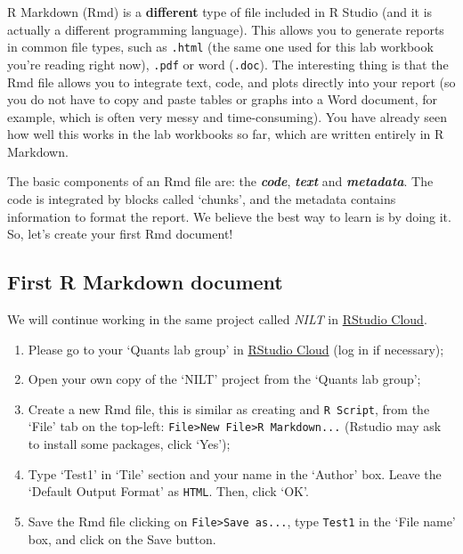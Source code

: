 \documentclass[
]{book}
\providecommand{\tightlist}{%
  \setlength{\itemsep}{0pt}\setlength{\parskip}{0pt}}
\begin{document}
R Markdown (Rmd) is a \textbf{different} type of file included in R Studio (and it is actually a different programming language). This allows you to generate reports in common file types, such as \texttt{.html} (the same one used for this lab workbook you're reading right now), \texttt{.pdf} or word (\texttt{.doc}). The interesting thing is that the Rmd file allows you to integrate text, code, and plots directly into your report (so you do not have to copy and paste tables or graphs into a Word document, for example, which is often very messy and time-consuming). You have already seen how well this works in the lab workbooks so far, which are written entirely in R Markdown.

The basic components of an Rmd file are: the \textbf{\emph{code}}, \textbf{\emph{text}} and \textbf{\emph{metadata}}. The code is integrated by blocks called `chunks', and the metadata contains information to format the report. We believe the best way to learn is by doing it. So, let's create your first Rmd document!

\hypertarget{first-r-markdown-document}{%
\subsection{First R Markdown document}\label{first-r-markdown-document}}

We will continue working in the same project called \emph{NILT} in \href{https://rstudio.cloud/}{RStudio Cloud}.

\begin{enumerate}
\def\labelenumi{\arabic{enumi}.}
\tightlist
\item
  Please go to your `Quants lab group' in \href{https://rstudio.cloud/}{RStudio Cloud} (log in if necessary);
\item
  Open your own copy of the `NILT' project from the `Quants lab group';
\item
  Create a new Rmd file, this is similar as creating and \texttt{R\ Script}, from the `File' tab on the top-left: \texttt{File\textgreater{}New\ File\textgreater{}R\ Markdown...} (Rstudio may ask to install some packages, click `Yes');
\item
  Type `Test1' in `Tile' section and your name in the `Author' box. Leave the `Default Output Format' as \texttt{HTML}. Then, click `OK'.
\item
  Save the Rmd file clicking on \texttt{File\textgreater{}Save\ as...}, type \texttt{Test1} in the `File name' box, and click on the Save button.
\end{enumerate}
\end{document}
